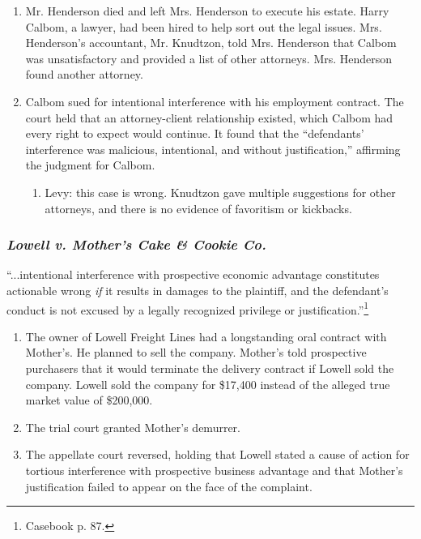 \begin{enumerate}
    \item Mr. Henderson died and left Mrs. Henderson to execute his estate. 
    Harry Calbom, a lawyer, had been hired to help sort out the legal issues. 
    Mrs. Henderson's accountant, Mr. Knudtzon, told Mrs. Henderson that Calbom 
    was unsatisfactory and provided a list of other attorneys. Mrs. Henderson 
    found another attorney.
    \item Calbom sued for intentional interference with his employment 
    contract. The court held that an attorney-client relationship existed, 
    which Calbom had every right to expect would continue. It found that the 
    ``defendants' interference was malicious, intentional, and without 
    justification,'' affirming the judgment for Calbom.
    \begin{enumerate}
        \item Levy: this case is wrong. Knudtzon gave multiple suggestions for 
        other attorneys, and there is no evidence of favoritism or kickbacks.
    \end{enumerate}
\end{enumerate}

\subsubsection{\emph{Lowell v. Mother's Cake \& Cookie Co.}}

``...intentional interference with prospective economic advantage constitutes 
actionable wrong \emph{if} it results in damages to the plaintiff, and the 
defendant's conduct is not excused by a legally recognized privilege or 
justification.''\footnote{Casebook p. 87.}

\begin{enumerate}
    \item The owner of Lowell Freight Lines had a longstanding oral contract with 
    Mother's. He planned to sell the company. Mother's told prospective 
    purchasers that it would terminate the delivery contract if Lowell sold 
    the company. Lowell sold the company for \$17,400 instead of the alleged 
    true market value of \$200,000.
    \item The trial court granted Mother's demurrer.
    \item The appellate court reversed, holding that Lowell stated a cause of 
    action for tortious interference with prospective business advantage and 
    that Mother's justification failed to appear on the face of the 
    complaint.
\end{enumerate}

